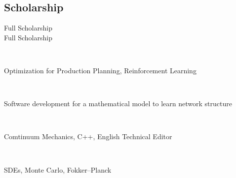 \documentclass[a4paper]{MagicalCV}
\begin{document}
\begin{minipage}[t]{0.33\textwidth}
\subsection{Scholarship}
\vspace{\topsep} %
Full Scholarship\\
\vspace{\topsep} %
Full Scholarship\\
\sectionsep


\end{minipage} 
\hfill
\begin{minipage}[t]{0.66\textwidth} 


 \\
\vspace{\topsep} %
\begin{tightemize}
\item Optimization for Production Planning, Reinforcement Learning
\end{tightemize}
\sectionsep

 \\
\vspace{\topsep} %
\begin{tightemize}
\item  Software development for a mathematical model to learn network structure
\end{tightemize}
\sectionsep

 \\
\vspace{\topsep} %
\begin{tightemize}
\item  Comtinuum Mechanics, C++, English Technical Editor
\end{tightemize}
\sectionsep

 \\
\vspace{\topsep} %
\begin{tightemize}
\item  SDEs, Monte Carlo, Fokker–Planck
\end{tightemize}
\sectionsep


\end{minipage}
\end{document}
